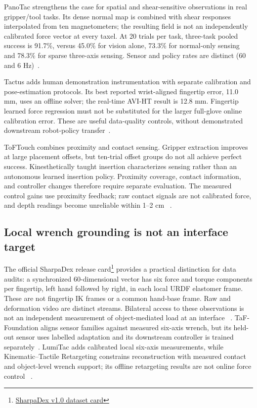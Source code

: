 PanoTac strengthens the case for spatial and shear-sensitive observations in
real gripper/tool tasks. Its dense normal map is combined with shear responses
interpolated from ten magnetometers; the resulting field is not an independently
calibrated force vector at every taxel. At 20 trials per task, three-task pooled
success is 91.7\%, versus 45.0\% for vision alone, 73.3\% for normal-only sensing
and 78.3\% for sparse three-axis sensing. Sensor and policy rates are distinct
(60 and 6 Hz)~\cite{nov2026panotac}.

Tactus adds human demonstration instrumentation with separate calibration and
pose-estimation protocols. Its best reported wrist-aligned fingertip error,
11.0 mm, uses an offline solver; the real-time AVI-HT result is 12.8 mm.
Fingertip learned force regression must not be substituted for the larger
full-glove online calibration error. These are useful data-quality controls,
without demonstrated downstream robot-policy transfer~\cite{nov2026tactus}.

ToFTouch combines proximity and contact sensing. Gripper extraction improves at
large placement offsets, but ten-trial offset groups do not all achieve perfect
success. Kinesthetically taught insertion characterizes sensing rather than an
autonomous learned insertion policy. Proximity coverage, contact information,
and controller changes therefore require separate evaluation. The measured
control gains use proximity feedback; raw contact signals are not calibrated
force, and depth readings become unreliable within 1--2 cm
~\cite{nov2026toftouch}.

\subsection{Local wrench grounding is not an interface target}

The official SharpaDex release card\footnote{\href{https://huggingface.co/datasets/Sharpa-Robotics/SharpaDex-v1.0\#tactile-modality}{SharpaDex v1.0 dataset card}} provides a practical distinction for data
audits: a synchronized 60-dimensional vector has six force and torque components
per fingertip, left hand followed by right, in each local URDF elastomer frame.
These are not fingertip IK frames or a common hand-base frame. Raw and deformation
video are distinct streams. Bilateral access to these observations is not an
independent measurement of object-mediated load at an interface
~\cite{nov18witac}. TaF-Foundation aligns sensor families against measured
six-axis wrench, but its held-out sensor uses labelled adaptation and its
downstream controller is trained separately~\cite{nov18taffoundation}.
LumiTac adds calibrated local six-axis measurements, while Kinematic--Tactile
Retargeting constrains reconstruction with measured contact and object-level
wrench support; its offline retargeting results are not online force control
~\cite{nov18lumitac,nov18kinematictactileretargeting}.

